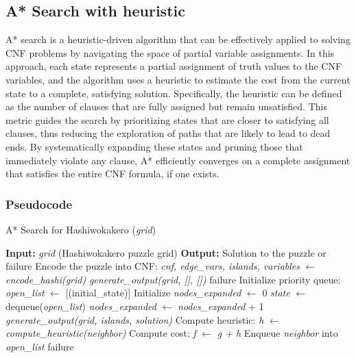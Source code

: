 \subsection{A* Search with heuristic}
\noindent A* search is a heuristic-driven algorithm that can be effectively applied to solving CNF problems by navigating the space of partial variable assignments. In this approach, each state represents a partial assignment of truth values to the CNF variables, and the algorithm uses a heuristic to estimate the cost from the current state to a complete, satisfying solution. Specifically, the heuristic can be defined as the number of clauses that are fully assigned but remain unsatisfied. This metric guides the search by prioritizing states that are closer to satisfying all clauses, thus reducing the exploration of paths that are likely to lead to dead ends. By systematically expanding these states and pruning those that immediately violate any clause, A* efficiently converges on a complete assignment that satisfies the entire CNF formula, if one exists.

\subsubsection{Pseudocode}
\begin{algorithm}[H]
    \caption{A* Search for Hashiwokakero (\textit{grid})}
    \label{alg:astar_hashiwokakero}
    \begin{algorithmic}[1]
        \State \textbf{Input:} \textit{grid} (Hashiwokakero puzzle grid)
        \State \textbf{Output:} Solution to the puzzle or failure
        \State Encode the puzzle into CNF: \textit{cnf, edge\_vars, islands, variables} $\gets$ \textit{encode\_hashi(grid)}
        \State \Return \textit{generate\_output(grid, [], [])}
        \Else
        \State \Return failure
        \EndIf
        \EndIf
        \State Initialize priority queue: \textit{open\_list} $\gets$ [(initial\_state)]
        \State Initialize \textit{nodes\_expanded} $\gets$ 0
        \State \textit{state} $\gets$ dequeue(\textit{open\_list})
        \State \textit{nodes\_expanded} $\gets$ \textit{nodes\_expanded} + 1
        \State \Return \textit{generate\_output(grid, islands, solution)}
        \EndIf
        \State Compute heuristic: \textit{h} $\gets$ \textit{compute\_heuristic(neighbor)}
        \State Compute cost: \textit{f} $\gets$ \textit{g + h}
        \State Enqueue \textit{neighbor} into \textit{open\_list}
        \EndIf
        \EndFor
        \EndWhile
        \State \Return failure
    \end{algorithmic}
\end{algorithm}

